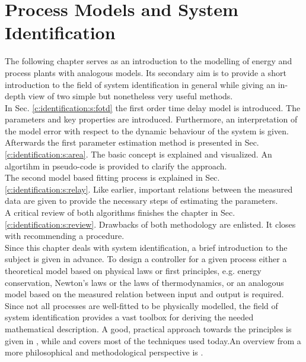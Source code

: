 \chapter{Process Models and System Identification}\label{c:identification}

The following chapter serves as an introduction to the modelling of energy and process plants with analogous models. Its secondary aim is to provide a short introduction to the field of system identification in general while giving an in-depth view of two simple but nonetheless very useful methods. 
\\

In Sec. \ref{c:identification:s:fotd} the first order time delay model is introduced. The parameters and key properties are introduced. Furthermore, an interpretation of the model error with respect to the dynamic behaviour of the system is given. \\

Afterwards the first parameter estimation method is presented in Sec. \ref{c:identification:s:area}. The basic concept is explained and visualized. An algortihm in pseudo-code is provided to clarify the approach. \\

The second model based fitting process is explained in Sec. \ref{c:identification:s:relay}. Like earlier, important relations between the measured data are given to provide the necessary steps of estimating the parameters. \\

A critical review of both algorithms finishes the chapter in Sec.\ref{c:identification:s:review}. Drawbacks of both methodology are enlisted. It closes with recommending a procedure.\\

Since this chapter deals with system identification, a brief introduction to the subject is given in advance. To design a controller for a given process either a theoretical model based on physical laws or first principles, e.g. energy conservation, Newton's laws or the laws of thermodynamics, or an analogous model based on the measured relation between input and output is required. Since not all processes are well-fitted to be physically modelled, the field of system identification provides a vast toolbox for deriving the needed mathematical description. A good, practical approach towards the principles is given in \cite{Keesman2011}, while \cite{Isermann1992} and \cite{Isermann1992a} covers most of the techniques used today.An overview from a more philosophical and methodological perspective is \cite{Ljung2010}.\\

